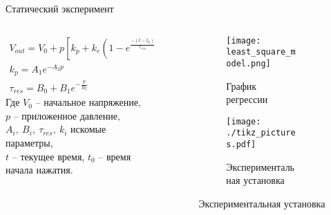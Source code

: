 \begin{frame}[t]{Статический эксперимент}
    \begin{columns}[T,onlytextwidth]
        \begin{column}{0.52\textwidth}
            \begin{eqnarray}
                V_{out} = V_0 + p[k_p + k_e(1-e^\frac{-(t-t_0)}{\tau_{res}})](1-e^{-\frac{A}{p}}) \\
                k_p = A_1e^{-A_2p} \\ \tau_{res} = B_0 + B_1e^{-\frac{p}{B_2}}
            \end{eqnarray}
            Где $V_0$ -- начальное напряжение, \\ $p$ -- приложенное давление, \\ $A_i,\ B_i,\ \tau_{res},\ k_i$ искомые параметры, \\  $t$ -- текущее время, $t_0$ -- время начала нажатия.
        \end{column}
        \begin{column}{0.45\textwidth}
            \vspace{-0.5cm}
            \begin{figure}[H]
                \begin{subfigure}{0.99\textwidth}
                    \centering\texttt{[image: least\_square\_model.png]}
                    \caption*{График регрессии}
                \end{subfigure}

                \begin{subfigure}{0.99\textwidth}
                    \centering
                    \centering\texttt{[image: ./tikz\_pictures.pdf]}
                    \caption*{Экспериментальная установка}
                \end{subfigure}
            \end{figure}
        \end{column}
    \end{columns}
\end{frame}


